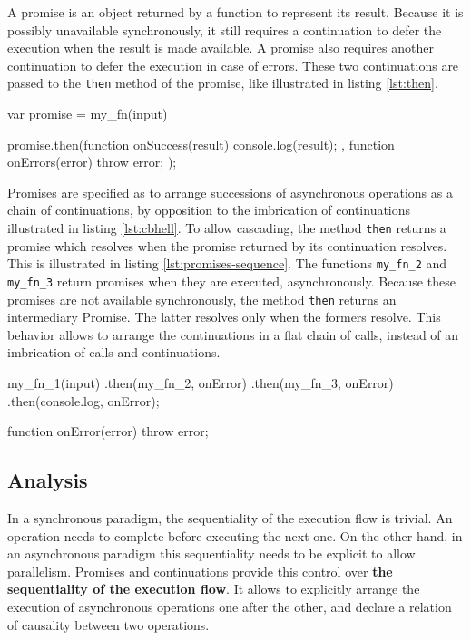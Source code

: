 A promise is an object returned by a function to represent its result.
Because it is possibly unavailable synchronously, it still requires a continuation to defer the execution when the result is made available.
A promise also requires another continuation to defer the execution in case of errors.
These two continuations are passed to the \texttt{then} method of the promise, like illustrated in listing \ref{lst:then}.

\begin{code}[js, %
             caption={Example of a promise}, %
             label={lst:then}] %
var promise = my_fn(input)

promise.then(function onSuccess(result) {
  console.log(result);
}, function onErrors(error) {
  throw error;
});
\end{code}

Promises are specified as to arrange successions of asynchronous operations as a chain of continuations, by opposition to the imbrication of continuations illustrated in listing \ref{lst:cbhell}.
To allow cascading, the method \texttt{then} returns a promise which resolves when the promise returned by its continuation resolves.
This is illustrated in listing \ref{lst:promises-sequence}.
The functions \texttt{my_fn_2} and \texttt{my_fn_3} return promises when they are executed, asynchronously.
Because these promises are not available synchronously, the method \texttt{then} returns an intermediary Promise.
The latter resolves only when the formers resolve.
This behavior allows to arrange the continuations in a flat chain of calls, instead of an imbrication of calls and continuations.

\begin{code}[js, %
             caption={Example of a chain of promise}, %
             label={lst:promises-sequence}] %
my_fn_1(input)
.then(my_fn_2, onError)
.then(my_fn_3, onError)
.then(console.log, onError);

function onError(error) {
  throw error;
}
\end{code}

\subsection{Analysis} \label{seciton:definitions:analysis}

In a synchronous paradigm, the sequentiality of the execution flow is trivial.
An operation needs to complete before executing the next one.
On the other hand, in an asynchronous paradigm this sequentiality needs to be explicit to allow parallelism.
Promises and continuations provide this control over \textbf{the sequentiality of the execution flow}.
It allows to explicitly arrange the execution of asynchronous operations one after the other, and declare a relation of causality between two operations.

